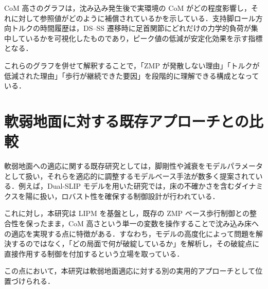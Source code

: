 CoM 高さのグラフは，沈み込み発生後で実環境の CoM がどの程度影響し，それに対して参照値がどのように補償されているかを示している．支持脚ロール方向トルクの時間履歴は，DS--SS 遷移時に足首関節にどれだけの力学的負荷が集中しているかを可視化したものであり，ピーク値の低減が安定化効果を示す指標となる．

これらのグラフを併せて解釈することで，「ZMP が発散しない理由」「トルクが低減された理由」「歩行が継続できた要因」を段階的に理解できる構成となっている．

\section{軟弱地面に対する既存アプローチとの比較}
\label{sec:qa_related_approaches}

軟弱地面への適応に関する既存研究としては，脚剛性や減衰をモデルパラメータとして扱い，それらを適応的に調整するモデルベース手法が数多く提案されている．例えば，Dual-SLIP モデルを用いた研究では，床の不確かさを含むダイナミクスを陽に扱い，ロバスト性を確保する制御設計が行われている．

これに対し，本研究は LIPM を基盤とし，既存の ZMP ベース歩行制御との整合性を保ったまま，CoM 高さという単一の変数を操作することで沈み込み床への適応を実現する点に特徴がある．すなわち，モデルの高度化によって問題を解決するのではなく，「どの局面で何が破綻しているか」を解析し，その破綻点に直接作用する制御を付加するという立場を取っている．

この点において，本研究は軟弱地面適応に対する別の実用的アプローチとして位置づけられる．
